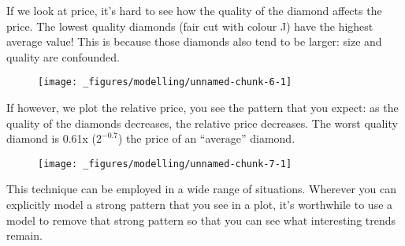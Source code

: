 If we look at price, it's hard to see how the quality of the diamond
affects the price. The lowest quality diamonds (fair cut with colour J)
have the highest average value! This is because those diamonds also tend
to be larger: size and quality are confounded.

\begin{Shaded}
\begin{Highlighting}[]
\OperatorTok{+}\StringTok{ }
\StringTok{  }\NormalTok{(}\NormalTok{(} \NormalTok{) }\OperatorTok{+}
\StringTok{  }\NormalTok{(}\NormalTok{(}
\end{Highlighting}
\end{Shaded}

\begin{figure}[H]
  \centering
  \texttt{[image: \_figures/modelling/unnamed-chunk-6-1]}
\end{figure}

If however, we plot the relative price, you see the pattern that you
expect: as the quality of the diamonds decreases, the relative price
decreases. The worst quality diamond is 0.61x (\(2 ^ {-0.7}\)) the price
of an ``average'' diamond.

\begin{Shaded}
\begin{Highlighting}[]
\OperatorTok{+}\StringTok{ }
\StringTok{  }\NormalTok{(}\NormalTok{(} \NormalTok{) }\OperatorTok{+}
\StringTok{  }\NormalTok{(}\NormalTok{(}
\end{Highlighting}
\end{Shaded}

\begin{figure}[H]
  \centering
  \texttt{[image: \_figures/modelling/unnamed-chunk-7-1]}
\end{figure}

This technique can be employed in a wide range of situations. Wherever
you can explicitly model a strong pattern that you see in a plot, it's
worthwhile to use a model to remove that strong pattern so that you can
see what interesting trends remain.

